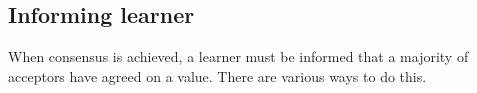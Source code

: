 %
%
%
%

\subsection{Informing learner}
When consensus is achieved, a learner must be informed that a majority of acceptors
have agreed on a value. There are various ways to do this.

